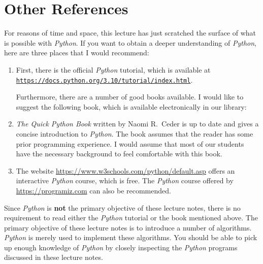 \section{Other References}
For reasons of time and space, this lecture has just scratched the surface of what is possible with
\textsl{Python}.  If you want to obtain a deeper understanding of \textsl{Python}, here are three places that 
I would recommend:
\begin{enumerate}
\item First, there is the official \textsl{Python} tutorial, which is available at
      \\[0.2cm]
      \hspace*{1.3cm}
      \href{https://docs.python.org/3.10/tutorial/index.html}{\texttt{https://docs.python.org/3.10/tutorial/index.html}}.

      Furthermore, there are a number of good books available.  I would like to suggest the following 
      book, which is available electronically in our library:
\item \emph{The Quick Python Book} written by Naomi R.~Ceder \cite{ceder:2018} is up to date and gives a
      concise introduction to \textsl{Python}.  The book assumes that the reader has some prior programming
      experience.  I would assume that most of our students have the necessary background to feel comfortable
      with this book.
\item The website
      \href{https://www.w3schools.com/python/default.asp}{https://www.w3schools.com/python/default.asp}
      offers an interactive \textsl{Python} course, which is free.
      The \textsl{Python} course offered by \href{https://programiz.com}{https://programiz.com} 
      can also be recommended.  
\end{enumerate}
Since \textsl{Python} is \textbf{not} the primary objective of these lecture notes, there is no requirement to read
either the \textsl{Python} tutorial or the book mentioned above.  The primary objective of these
lecture notes is to introduce a number of algorithms.
\textsl{Python} is merely used to implement these algorithms.  You should
be able to pick up enough knowledge of \textsl{Python} by closely inspecting the \textsl{Python} programs
discussed in these lecture notes.  


